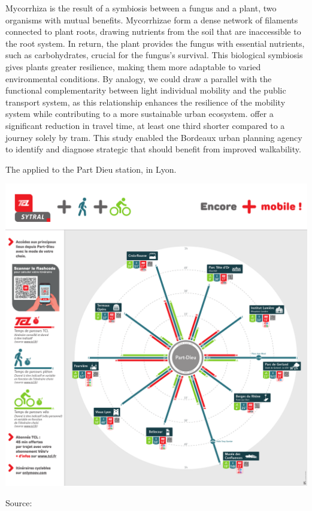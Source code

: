 \begin{refsegment}
{Mycorrhiza is the result of a symbiosis between a fungus and a plant, two organisms with mutual benefits. Mycorrhizae form a dense network of filaments connected to plant roots, drawing nutrients from the soil that are inaccessible to the root system. In return, the plant provides the fungus with essential nutrients, such as carbohydrates, crucial for the fungus's survival. This biological symbiosis gives plants greater resilience, making them more adaptable to varied environmental conditions. By analogy, we could draw a parallel with the functional complementarity between light individual mobility and the public transport system, as this relationship enhances the resilience of the mobility system while contributing to a more \gls{sustainable} urban ecosystem.
} offer a significant reduction in travel time, at least one third shorter compared to a journey solely by tram. This study enabled the Bordeaux urban planning agency to identify and diagnose strategic  that should benefit from improved \gls{walkability}.%

    \begin{carte}[h!]\vspace*{4pt}
        \caption{The  applied to the Part Dieu station, in Lyon.}
        \label{fig-chap5:rose-modes-reseau-part-dieu}
        \centerline{\includegraphics[width=1\columnwidth]{src/Figures/Chap-5/EN_Detours_Part_Dieu_rose_des_modes_TCL_FR.pdf}}
        \vspace{5pt}
        \begin{flushright}\scriptsize{
        Source: \textcolor{blue}{\textcite{tcl_transports_2023}}
        }\end{flushright}
    \end{carte}


\end{refsegment}
